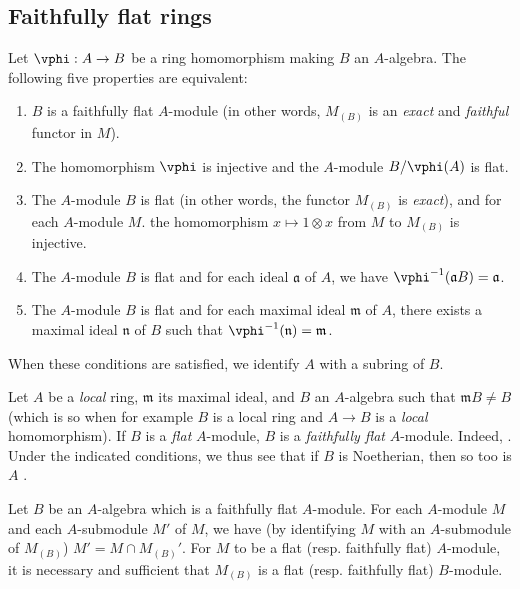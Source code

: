 \subsection{Faithfully flat rings}
\label{subsection:0.6.6}

\begin{env}[6.6.1]
\label{0.6.6.1}
Let $\vphi:A\to B$ be a ring homomorphism making $B$ an $A$-algebra. The following five
properties are equivalent:
\begin{enumerate}
  \item[(a)] $B$ is a faithfully flat $A$-module (in other words, $M_{(B)}$ is an \emph{exact}
    and \emph{faithful} functor in $M$).
  \item[(b)] The homomorphism $\vphi$ is injective and the $A$-module $B/\vphi(A)$ is flat.
  \item[(c)] The $A$-module $B$ is flat (in other words, the functor $M_{(B)}$ is \emph{exact}),
    and for each $A$-module $M$. the homomorphism $x\mapsto 1\otimes x$ from $M$ to $M_{(B)}$ is
    injective.
  \item[(d)] The $A$-module $B$ is flat and for each ideal $\mathfrak{a}$ of $A$, we have
    $\vphi^{-1}(\mathfrak{a}B)=\mathfrak{a}$.
  \item[(e)] The $A$-module $B$ is flat and for each maximal ideal $\mathfrak{m}$ of $A$, there
    exists a maximal ideal $\mathfrak{n}$ of $B$ such that $\vphi^{-1}(\mathfrak{n})=\mathfrak{m}$.
\end{enumerate}

When these conditions are satisfied, we identify $A$ with a subring of $B$.
\end{env}

\begin{env}[6.6.2]
\label{0.6.6.2}
Let $A$ be a \emph{local} ring, $\mathfrak{m}$ its maximal ideal, and $B$ an $A$-algebra such
that $\mathfrak{m}B\neq B$ (which is so when for example $B$ is a local ring and $A\to B$ is
a \emph{local} homomorphism). If $B$ is a \emph{flat} $A$-module, $B$ is a \emph{faithfully
flat} $A$-module.
Indeed, .
Under the indicated conditions, we thus see that if $B$ is Noetherian, then so too is $A$ .
\end{env}

\begin{env}[6.6.3]
\label{0.6.6.3}
Let $B$ be an $A$-algebra which is a faithfully flat $A$-module. For each $A$-module $M$ and
each $A$-submodule $M'$ of $M$, we have (by identifying $M$ with an $A$-submodule of
$M_{(B)}$) $M'=M\cap M_{(B)}'$. For $M$ to be a flat (resp. faithfully flat) $A$-module, it
is necessary and sufficient that $M_{(B)}$ is a flat (resp. faithfully flat) $B$-module.
\end{env}

